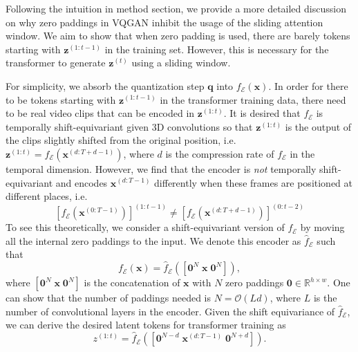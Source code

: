 Following the intuition in method section, we provide a more detailed discussion on why zero paddings in VQGAN inhibit the usage of the sliding attention window. 
We aim to show that when zero padding is used, there are barely tokens starting with $\mathbf{z}^{(1:t-1)}$ in the training set. 
However, this is necessary for the transformer to generate $\mathbf{z}^{(t)}$ using a sliding window. 

For simplicity, we absorb the quantization step $\mathbf{q}$ into $f_\mathcal{E}(\mathbf{x})$. 
In order for there to be tokens starting with $\mathbf{z}^{(1:t-1)}$ in the transformer training data, there need to be real video clips that can be encoded in $\mathbf{z}^{(1:t)}$. 
It is desired that $f_\mathcal{E}$ is temporally shift-equivariant given 3D convolutions so that $\mathbf{z}^{(1:t)}$ is the output of the clips slightly shifted from the original position, i.e. $\mathbf{z}^{(1:t)} = f_\mathcal{E}(\mathbf{x}^{(d:T+d-1)})$, where $d$ is the compression rate of $f_\mathcal{E}$ in the temporal dimension. 
However, we find that the encoder is \emph{not} temporally shift-equivariant and encodes $\mathbf{x}^{(d:T-1)}$ differently when these frames are positioned at different places, i.e.
\begin{equation}
    \label{eq:full_consistency}
    [f_\mathcal{E}(\mathbf{x}^{(0:T-1)})]^{(1:t-1)} \neq [f_\mathcal{E}(\mathbf{x}^{(d:T+d-1)})]^{(0:t-2)}
\end{equation} 
To see this theoretically, we consider a shift-equivariant version of $f_\mathcal{E}$ by moving all the internal zero paddings to the input. 
We denote this encoder as $\hat{f}_\mathcal{E}$ such that
\begin{equation}
    \label{eq:equal_encoder}
    f_\mathcal{E}(\mathbf{x}) = \hat{f}_\mathcal{E}([\mathbf{0}^N \; \mathbf{x} \; \mathbf{0}^N]),
\end{equation}
where $[\mathbf{0}^N \; \mathbf{x} \; \mathbf{0}^N]$ is the concatenation of $\mathbf{x}$ with $N$ zero paddings $\mathbf{0} \in \mathbb{R}^{h\times w}$. 
One can show that the number of paddings needed is $N = \mathcal{O}(Ld)$, 
where $L$ is the number of convolutional layers in the encoder. 
Given the shift equivariance of $\hat{f}_\mathcal{E}$, we can derive the desired latent tokens for transformer training as 
$$z^{(1:t)} = \hat{f}_\mathcal{E}([\mathbf{0}^{N-d} \; \mathbf{x}^{(d:T-1)} \; \mathbf{0}^{N+d}]).$$ 
